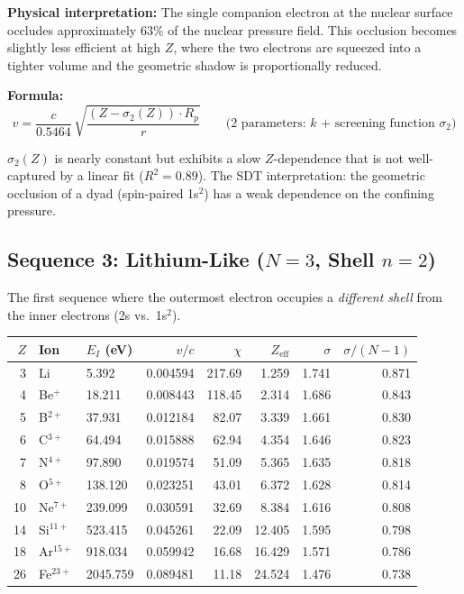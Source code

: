 \textbf{Physical interpretation:} The single companion electron at the nuclear surface occludes approximately 63\% of the nuclear pressure field.  This occlusion becomes slightly less efficient at high $Z$, where the two electrons are squeezed into a tighter volume and the geometric shadow is proportionally reduced.

\textbf{Formula:}
\begin{equation}
  v = \frac{c}{0.5464}\,\sqrt{\frac{(Z - \sigma_2(Z)) \cdot R_p}{r}}
  \qquad\text{(2 parameters: $k$ + screening function $\sigma_2$)}
\end{equation}

$\sigma_2(Z)$ is nearly constant but exhibits a slow $Z$-dependence that is not well-captured by a linear fit ($R^2 = 0.89$).  The SDT interpretation: the geometric occlusion of a dyad (spin-paired 1s$^2$) has a weak dependence on the confining pressure.


\subsection{Sequence 3: Lithium-Like ($N = 3$, Shell $n = 2$)}

The first sequence where the outermost electron occupies a \emph{different shell} from the inner electrons (2s vs.\ 1s$^2$).

\begin{center}
\small
\begin{tabular}{rllrrrrr}
\hline
$Z$ & Ion & $E_I$ (eV) & $v/c$ & $\chi$ & $Z_{\text{eff}}$ & $\sigma$ & $\sigma/(N{-}1)$ \\
\hline
 3 & Li          &    5.392 & 0.004594 & 217.69 &  1.259 &  1.741 & 0.871 \\
 4 & Be$^+$      &   18.211 & 0.008443 & 118.45 &  2.314 &  1.686 & 0.843 \\
 5 & B$^{2+}$    &   37.931 & 0.012184 &  82.07 &  3.339 &  1.661 & 0.830 \\
 6 & C$^{3+}$    &   64.494 & 0.015888 &  62.94 &  4.354 &  1.646 & 0.823 \\
 7 & N$^{4+}$    &   97.890 & 0.019574 &  51.09 &  5.365 &  1.635 & 0.818 \\
 8 & O$^{5+}$    &  138.120 & 0.023251 &  43.01 &  6.372 &  1.628 & 0.814 \\
10 & Ne$^{7+}$   &  239.099 & 0.030591 &  32.69 &  8.384 &  1.616 & 0.808 \\
14 & Si$^{11+}$  &  523.415 & 0.045261 &  22.09 & 12.405 &  1.595 & 0.798 \\
18 & Ar$^{15+}$  &  918.034 & 0.059942 &  16.68 & 16.429 &  1.571 & 0.786 \\
26 & Fe$^{23+}$  & 2045.759 & 0.089481 &  11.18 & 24.524 &  1.476 & 0.738 \\
\hline
\end{tabular}
\end{center}

